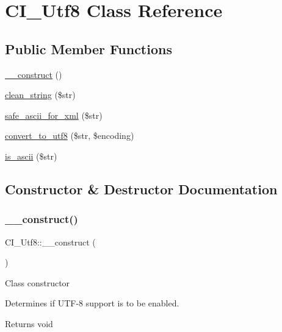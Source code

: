 \hypertarget{class_c_i___utf8}{}\section{C\+I\+\_\+\+Utf8 Class Reference}
\label{class_c_i___utf8}
\subsection*{Public Member Functions}
\begin{DoxyCompactItemize}
\item 
\mbox{\hyperlink{class_c_i___utf8_abfc2d1509d9d8fa2c5ca5c6237977180}{\+\_\+\+\_\+construct}} ()
\item 
\mbox{\hyperlink{class_c_i___utf8_ad0cc040da9adb399f9ef89f339b691be}{clean\+\_\+string}} (\$str)
\item 
\mbox{\hyperlink{class_c_i___utf8_a190de9ab8c8b098c3dafaeb52a1936a5}{safe\+\_\+ascii\+\_\+for\+\_\+xml}} (\$str)
\item 
\mbox{\hyperlink{class_c_i___utf8_a9c2aa3162f7c478217fc3ed41f33f36a}{convert\+\_\+to\+\_\+utf8}} (\$str, \$encoding)
\item 
\mbox{\hyperlink{class_c_i___utf8_aa6ed383edc1860614d3a711b8aa7bc31}{is\+\_\+ascii}} (\$str)
\end{DoxyCompactItemize}


\subsection{Constructor \& Destructor Documentation}
\mbox{\label{class_c_i___utf8_abfc2d1509d9d8fa2c5ca5c6237977180}} 
\subsubsection{\texorpdfstring{\+\_\+\+\_\+construct()}{\_\_construct()}}
{\footnotesize\ttfamily C\+I\+\_\+\+Utf8\+::\+\_\+\+\_\+construct (\begin{DoxyParamCaption}{ }\end{DoxyParamCaption})}

Class constructor

Determines if U\+T\+F-\/8 support is to be enabled.

\begin{DoxyReturn}{Returns}
void 
\end{DoxyReturn}



